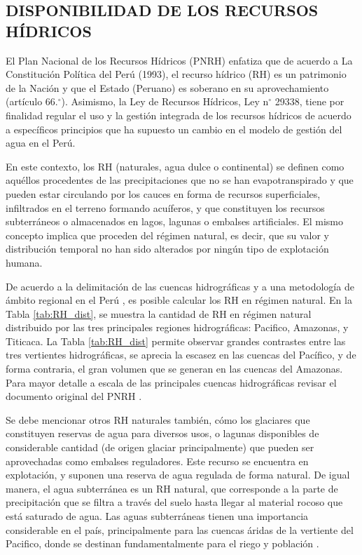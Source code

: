 \documentclass[12pt]{article}
\begin{document}
\thispagestyle{empty}

\subsection{DISPONIBILIDAD DE LOS RECURSOS HÍDRICOS}

El Plan Nacional de los Recursos Hídricos (PNRH) \citep{PNRH2013} enfatiza que de acuerdo a La Constitución Política del Perú (1993), el recurso hídrico (RH) es un patrimonio de la Nación y que el Estado (Peruano) es soberano en su aprovechamiento (artículo 66.$^{\circ}$). Asimismo, la Ley de Recursos Hídricos, Ley n$^{\circ}$ 29338, tiene por finalidad regular el uso y la gestión integrada de los recursos hídricos de acuerdo a específicos principios que ha supuesto un cambio en el modelo de gestión del agua en el Perú. 

En este contexto, los RH (naturales, agua dulce o continental) se definen como aquéllos procedentes de las precipitaciones que no se han evapotranspirado y que pueden estar circulando por los cauces en forma de recursos superficiales, infiltrados en el terreno formando acuíferos, y que constituyen los recursos subterráneos o almacenados en lagos, lagunas o embalses artificiales. El mismo concepto implica que proceden del régimen natural, es decir, que su valor y distribución temporal no han sido alterados por ningún tipo de explotación humana.

De acuerdo a la delimitación de las cuencas hidrográficas y a una metodología de ámbito regional en el Perú \citep{PNRH2013}, es posible calcular los RH en régimen natural. En la Tabla \ref{tab:RH_dist}, se muestra la cantidad de RH en régimen natural distribuido por las tres principales regiones hidrográficas: Pacifico, Amazonas, y Titicaca. La Tabla \ref{tab:RH_dist} permite observar grandes contrastes entre las tres vertientes hidrográficas, se aprecia la escasez en las cuencas del Pacífico, y de forma contraria, el gran volumen que se generan en las cuencas del Amazonas. Para mayor detalle a escala de las principales cuencas hidrográficas revisar el documento original del PNRH \citep{PNRH2013}.

\clearpage

\clearpage

Se debe mencionar otros RH naturales también, cómo los glaciares que constituyen reservas de agua para diversos usos, o lagunas disponibles de considerable cantidad (de origen glaciar principalmente) que pueden ser aprovechadas como embalses reguladores. Este recurso se encuentra en explotación, y suponen una reserva de agua regulada de forma natural. De igual manera, el agua subterránea es un RH natural, que corresponde a la parte de precipitación que se filtra a través del suelo hasta llegar al material rocoso que está saturado de agua. Las aguas subterráneas tienen una importancia considerable en el país, principalmente para las cuencas áridas de la vertiente del Pacifico, donde se destinan fundamentalmente para el riego y población \citep{PNRH2013}. 
\end{document}
